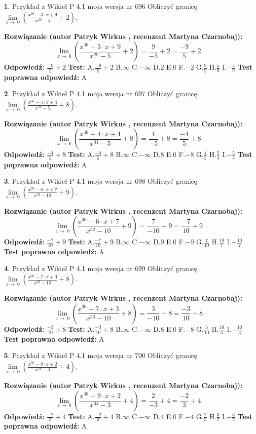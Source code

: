 \documentclass[12pt, a4paper]{article}
\theoremstyle{definition} %
\newtheorem{zad}{}
\newcommand{\zadStart}[1]{\begin{zad}#1\newline}
\newcommand{\zadStop}{\end{zad}}
\newcommand{\rozwStart}[2]{\noindent \textbf{Rozwiązanie (autor #1 , recenzent #2): }\newline}
\newcommand{\rozwStop}{\newline}
\newcommand{\odpStart}{\noindent \textbf{Odpowiedź:}\newline}
\newcommand{\odpStop}{\newline}
\newcommand{\testStart}{\noindent \textbf{Test:}\newline}
\newcommand{\testStop}{\newline}
\newcommand{\kluczStart}{\noindent \textbf{Test poprawna odpowiedź:}\newline}
\newcommand{\kluczStop}{\newline}
\begin{document}
\zadStart{Przykład z Wikieł P 4.1 moja wersja nr 696}
Obliczyć granicę $\lim\limits_{x\to\ 0}(\frac{x^{36}-3 \cdot x +9}{x^{29}-5}+2)$.
\zadStop
\rozwStart{Patryk Wirkus}{Martyna Czarnobaj}
$$\lim\limits_{x\to\ 0}(\frac{x^{36}-3 \cdot x +9}{x^{29}-5}+2)=\frac{9}{-5}+2=\frac{-9}{5}+2$$
\rozwStop
\odpStart
$\frac{-9}{5}+2$
\odpStop
\testStart
A.$\frac{-9}{5}+2$
B.$\infty$
C.$-\infty$
D.$2$
E.$0$
F.$-2$
G.$\frac{9}{5}$
H.$\frac{5}{9}$
I.$-\frac{5}{9}$
\testStop
\kluczStart
A
\kluczStop



\zadStart{Przykład z Wikieł P 4.1 moja wersja nr 697}
Obliczyć granicę $\lim\limits_{x\to\ 0}(\frac{x^{36}-4 \cdot x +4}{x^{31}-5}+8)$.
\zadStop
\rozwStart{Patryk Wirkus}{Martyna Czarnobaj}
$$\lim\limits_{x\to\ 0}(\frac{x^{36}-4 \cdot x +4}{x^{31}-5}+8)=\frac{4}{-5}+8=\frac{-4}{5}+8$$
\rozwStop
\odpStart
$\frac{-4}{5}+8$
\odpStop
\testStart
A.$\frac{-4}{5}+8$
B.$\infty$
C.$-\infty$
D.$8$
E.$0$
F.$-8$
G.$\frac{4}{5}$
H.$\frac{5}{4}$
I.$-\frac{5}{4}$
\testStop
\kluczStart
A
\kluczStop



\zadStart{Przykład z Wikieł P 4.1 moja wersja nr 698}
Obliczyć granicę $\lim\limits_{x\to\ 0}(\frac{x^{36}-6 \cdot x +7}{x^{32}-10}+9)$.
\zadStop
\rozwStart{Patryk Wirkus}{Martyna Czarnobaj}
$$\lim\limits_{x\to\ 0}(\frac{x^{36}-6 \cdot x +7}{x^{32}-10}+9)=\frac{7}{-10}+9=\frac{-7}{10}+9$$
\rozwStop
\odpStart
$\frac{-7}{10}+9$
\odpStop
\testStart
A.$\frac{-7}{10}+9$
B.$\infty$
C.$-\infty$
D.$9$
E.$0$
F.$-9$
G.$\frac{7}{10}$
H.$\frac{10}{7}$
I.$-\frac{10}{7}$
\testStop
\kluczStart
A
\kluczStop



\zadStart{Przykład z Wikieł P 4.1 moja wersja nr 699}
Obliczyć granicę $\lim\limits_{x\to\ 0}(\frac{x^{36}-7 \cdot x +3}{x^{33}-10}+8)$.
\zadStop
\rozwStart{Patryk Wirkus}{Martyna Czarnobaj}
$$\lim\limits_{x\to\ 0}(\frac{x^{36}-7 \cdot x +3}{x^{33}-10}+8)=\frac{3}{-10}+8=\frac{-3}{10}+8$$
\rozwStop
\odpStart
$\frac{-3}{10}+8$
\odpStop
\testStart
A.$\frac{-3}{10}+8$
B.$\infty$
C.$-\infty$
D.$8$
E.$0$
F.$-8$
G.$\frac{3}{10}$
H.$\frac{10}{3}$
I.$-\frac{10}{3}$
\testStop
\kluczStart
A
\kluczStop



\zadStart{Przykład z Wikieł P 4.1 moja wersja nr 700}
Obliczyć granicę $\lim\limits_{x\to\ 0}(\frac{x^{36}-9 \cdot x +2}{x^{34}-3}+4)$.
\zadStop
\rozwStart{Patryk Wirkus}{Martyna Czarnobaj}
$$\lim\limits_{x\to\ 0}(\frac{x^{36}-9 \cdot x +2}{x^{34}-3}+4)=\frac{2}{-3}+4=\frac{-2}{3}+4$$
\rozwStop
\odpStart
$\frac{-2}{3}+4$
\odpStop
\testStart
A.$\frac{-2}{3}+4$
B.$\infty$
C.$-\infty$
D.$4$
E.$0$
F.$-4$
G.$\frac{2}{3}$
H.$\frac{3}{2}$
I.$-\frac{3}{2}$
\testStop
\kluczStart
A
\kluczStop
\end{document}
